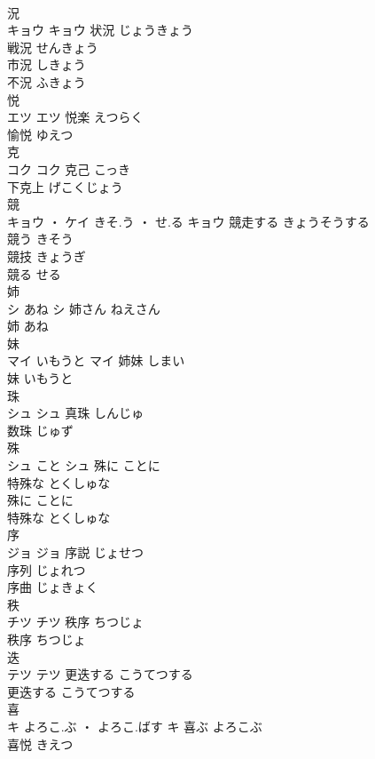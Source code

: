 \documentclass[8pt]{extreport}
\begin{document}
\begin{CJK}{UTF8}{min}
\\	況	
\\	キョウ		キョウ	状況	じょうきょう	
\\	戦況	せんきょう	
\\	市況	しきょう	
\\	不況	ふきょう	
\\	悦	
\\	エツ		エツ	悦楽	えつらく	
\\	愉悦	ゆえつ	
\\	克	
\\	コク		コク	克己	こっき	
\\	下克上	げこくじょう	
\\	競	
\\	キョウ ・ ケイ	きそ.う ・ せ.る	キョウ	競走する	きょうそうする	
\\	競う	きそう	
\\	競技	きょうぎ	
\\	競る	せる	
\\	姉	
\\	シ	あね	シ	姉さん	ねえさん	
\\	姉	あね	
\\	妹	
\\	マイ	いもうと	マイ	姉妹	しまい	
\\	妹	いもうと	
\\	珠	
\\	シュ		シュ	真珠	しんじゅ	
\\	数珠	じゅず	
\\	殊	
\\	シュ	こと	シュ	殊に	ことに	
\\	特殊な	とくしゅな	
\\	殊に	ことに	
\\	特殊な	とくしゅな	
\\	序	
\\	ジョ		ジョ	序説	じょせつ	
\\	序列	じょれつ	
\\	序曲	じょきょく	
\\	秩	
\\	チツ		チツ	秩序	ちつじょ	
\\	秩序	ちつじょ	
\\	迭	
\\	テツ		テツ	更迭する	こうてつする	
\\	更迭する	こうてつする	
\\	喜	
\\	キ	よろこ.ぶ ・ よろこ.ばす	キ	喜ぶ	よろこぶ	
\\	喜悦	きえつ	

\end{CJK}
\end{document}
